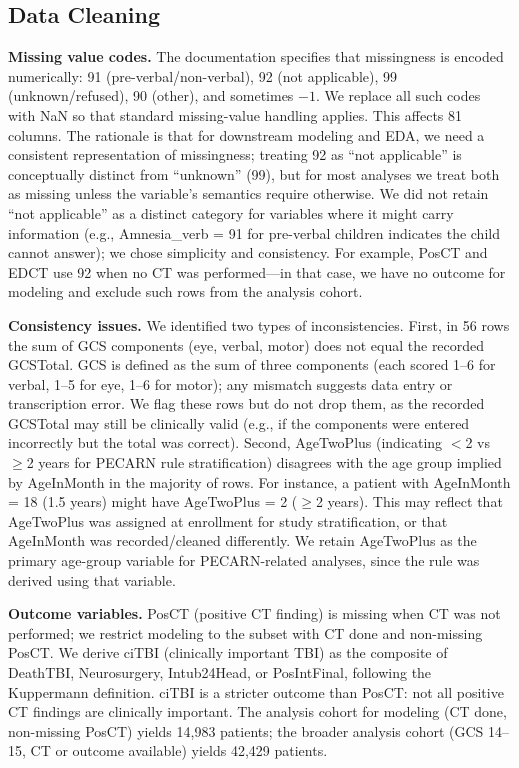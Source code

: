 \documentclass[10pt,letterpaper]{article}
\begin{document}
\subsection{Data Cleaning}\label{data-cleaning}

\textbf{Missing value codes.} The documentation specifies that missingness is encoded numerically: 91 (pre-verbal/non-verbal), 92 (not applicable), 99 (unknown/refused), 90 (other), and sometimes $-1$. We replace all such codes with NaN so that standard missing-value handling applies. This affects 81 columns. The rationale is that for downstream modeling and EDA, we need a consistent representation of missingness; treating 92 as ``not applicable'' is conceptually distinct from ``unknown'' (99), but for most analyses we treat both as missing unless the variable's semantics require otherwise. We did not retain ``not applicable'' as a distinct category for variables where it might carry information (e.g., Amnesia\_verb = 91 for pre-verbal children indicates the child cannot answer); we chose simplicity and consistency. For example, PosCT and EDCT use 92 when no CT was performed---in that case, we have no outcome for modeling and exclude such rows from the analysis cohort.

\textbf{Consistency issues.} We identified two types of inconsistencies. First, in 56 rows the sum of GCS components (eye, verbal, motor) does not equal the recorded GCSTotal. GCS is defined as the sum of three components (each scored 1--6 for verbal, 1--5 for eye, 1--6 for motor); any mismatch suggests data entry or transcription error. We flag these rows but do not drop them, as the recorded GCSTotal may still be clinically valid (e.g., if the components were entered incorrectly but the total was correct). Second, AgeTwoPlus (indicating $<$2 vs $\ge$2 years for PECARN rule stratification) disagrees with the age group implied by AgeInMonth in the majority of rows. For instance, a patient with AgeInMonth = 18 (1.5 years) might have AgeTwoPlus = 2 ($\ge$2 years). This may reflect that AgeTwoPlus was assigned at enrollment for study stratification, or that AgeInMonth was recorded/cleaned differently. We retain AgeTwoPlus as the primary age-group variable for PECARN-related analyses, since the rule was derived using that variable.

\textbf{Outcome variables.} PosCT (positive CT finding) is missing when CT was not performed; we restrict modeling to the subset with CT done and non-missing PosCT. We derive ciTBI (clinically important TBI) as the composite of DeathTBI, Neurosurgery, Intub24Head, or PosIntFinal, following the Kuppermann definition. ciTBI is a stricter outcome than PosCT: not all positive CT findings are clinically important. The analysis cohort for modeling (CT done, non-missing PosCT) yields 14,983 patients; the broader analysis cohort (GCS 14--15, CT or outcome available) yields 42,429 patients.
\end{document}
